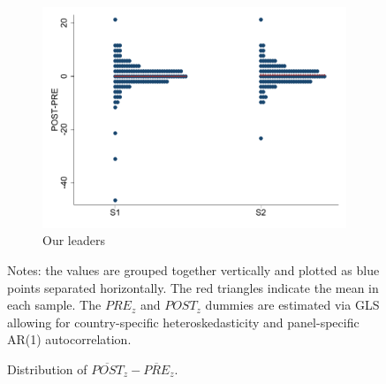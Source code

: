 \begin{figure}[h]
    \\
    \begin{subfigure}[b]{0.45\textwidth}
        \includegraphics[width=\textwidth]{Figures/Own_distribution.pdf}
        \caption{Our leaders}
        \label{fig:Own}
    \end{subfigure}
    \caption{Distribution of $\overline{POST}_z-\overline{PRE}_z$.}\label{fig:distribution}
    \medskip %
    \begin{minipage}{0.9\textwidth} %
    	{\footnotesize  Notes: the values are grouped together vertically and plotted as blue points separated horizontally. The red triangles indicate the mean in each sample. The $PRE_z$ and $POST_z$ dummies are estimated via GLS allowing for country-specific heteroskedasticity and panel-specific AR(1) autocorrelation.\par}
    \end{minipage}
\end{figure}
